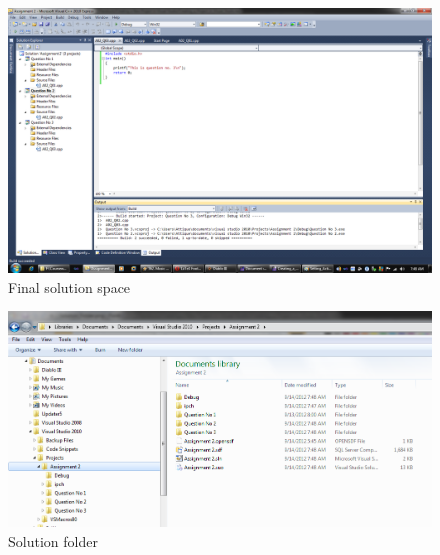 \documentclass{article}
\begin{document}
\begin{figure}[H]
\centering
\includegraphics[width=\textwidth]{Final_Solution_Space.png}
\caption{Final solution space}
\end{figure}

\begin{figure}[H]
\centering
\includegraphics[width=\textwidth]{Solution_Folder.png}
\caption{Solution folder}
\end{figure}
\end{document}
